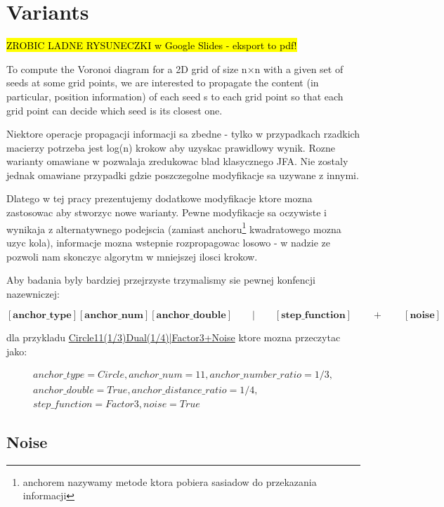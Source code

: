 \documentclass[format=acmsmall,screen,review,authordraft,nonacm]{acmart}
\newcommand\longvar[1]{\mathchardef\UrlBreakPenalty=100
\mathchardef\UrlBigBreakPenalty=100\url{#1}}
\begin{document}
\section{Variants} %

\hl{ZROBIC LADNE RYSUNECZKI w Google Slides - eksport to pdf!}

To compute the Voronoi diagram for a 2D grid of size n×n
with a given set of seeds at some grid points, we are interested to
propagate the content (in particular, position information) of each
seed s to each grid point so that each grid point can decide which
seed is its closest one.

Niektore operacje propagacji informacji sa zbedne - tylko w przypadkach
rzadkich macierzy potrzeba jest log(n) krokow aby uzyskac prawidlowy wynik.
Rozne warianty omawiane w \cite{rong2007variants} pozwalaja zredukowac blad
klasycznego JFA. Nie zostaly jednak omawiane przypadki gdzie poszczegolne
modyfikacje sa uzywane z innymi.

Dlatego w tej pracy prezentujemy dodatkowe modyfikacje ktore mozna zastosowac
aby stworzyc nowe warianty. Pewne modyfikacje sa oczywiste i wynikaja z
alternatywnego podejscia (zamiast anchoru\footnote{anchorem nazywamy metode
ktora pobiera sasiadow do przekazania informacji} kwadratowego mozna uzyc kola),
informacje mozna wstepnie rozpropagowac losowo - w nadzie ze pozwoli nam
skonczyc algorytm w mniejszej ilosci krokow.

Aby badania byly bardziej przejrzyste trzymalismy sie pewnej konfencji
nazewniczej:

$$
[\bm{anchor\_type}][\bm{anchor\_num}][\bm{anchor\_double}]\qquad|\qquad[\bm{step\_function}]\qquad+\qquad[\bm{noise}]
$$

dla przykladu \longvar{Circle11(1/3)Dual(1/4)|Factor3+Noise} ktore mozna
przeczytac jako:

\begin{multline}
anchor\_type=Circle, anchor\_num=11, anchor\_number\_ratio=1/3, \\
anchor\_double=True, anchor\_distance\_ratio=1/4, \\
step\_function=Factor3, noise=True
\end{multline}

\subsection{Noise} %
\end{document}

